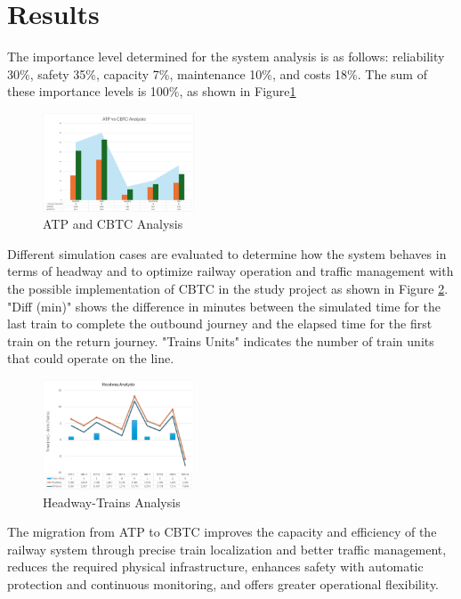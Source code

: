 \documentclass[conference]{IEEEtran}
\begin{document}
\section{Results}
The importance level determined for the system analysis is as follows: reliability 30\%, safety 35\%, capacity 7\%, maintenance 10\%, and costs 18\%. The sum of these importance levels is 100\%, as shown in Figure\ref{fig:Analysis}
\begin{figure}[htbp]
    \centering
\includegraphics[width=0.4\textwidth, scale=1]{Imagenes_general/Grahp_general.png}
    \caption{ ATP and CBTC Analysis}
    \label{fig:Analysis}
\end{figure}

Different simulation cases are evaluated to determine how the system behaves in terms of headway and to optimize railway operation and traffic management with the possible implementation of CBTC in the study project as shown in Figure \ref{fig:Headway-Trains Analysis}. "Diff (min)" shows the difference in minutes between the simulated time for the last train to complete the outbound journey and the elapsed time for the first train on the return journey. "Trains Units" indicates the number of train units that could operate on the line. 
\begin{figure}[htbp]
    \centering
\includegraphics[width=0.4\textwidth,scale=1]{Imagenes_general/Analysis_Headway.jpg}
    \caption{Headway-Trains Analysis}
    \label{fig:Headway-Trains Analysis}
\end{figure}
The migration from ATP to CBTC improves the capacity and efficiency of the railway system through precise train localization and better traffic management, reduces the required physical infrastructure, enhances safety with automatic protection and continuous monitoring, and offers greater operational flexibility.\\
\end{document}
